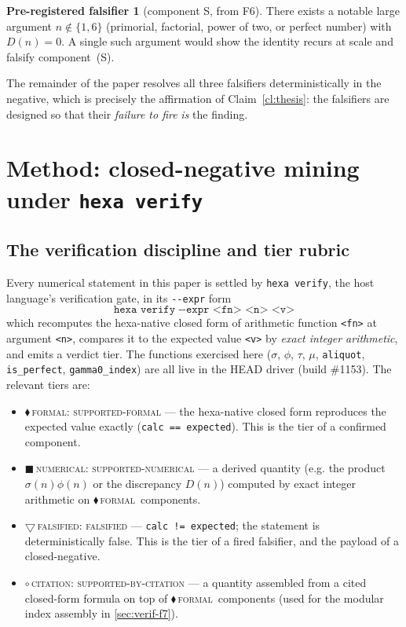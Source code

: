 \documentclass[11pt,a4paper]{article}
\newcommand{\sig}{\sigma}
\newcommand{\Dn}{D(n)}
\newcommand{\tierF}{\textcolor{blue!60!black}{$\blacklozenge$}\,\textsc{formal}}
\newcommand{\tierN}{\textcolor{green!45!black}{$\blacksquare$}\,\textsc{numerical}}
\newcommand{\tierR}{\textcolor{red!70!black}{$\bigtriangledown$}\,\textsc{falsified}}
\newcommand{\tierC}{\textcolor{orange!85!black}{$\circ$}\,\textsc{citation}}
\theoremstyle{definition}
\newtheorem{falsifier}{Pre-registered falsifier}
\begin{document}
\begin{falsifier}[component S, from F6]\label{f:S}
There exists a notable large argument $n\notin\{1,6\}$ (primorial, factorial,
power of two, or perfect number) with $\Dn=0$. A single such argument would
show the identity recurs at scale and falsify component~(S).
\end{falsifier}

The remainder of the paper resolves all three falsifiers deterministically in
the negative, which is precisely the affirmation of Claim~\ref{cl:thesis}: the
falsifiers are designed so that their \emph{failure to fire} \emph{is} the
finding.

\section{Method: closed-negative mining under \texttt{hexa verify}}
\label{sec:method}

\subsection{The verification discipline and tier rubric}

Every numerical statement in this paper is settled by \texttt{hexa verify}, the
host language's verification gate, in its \texttt{-{}-expr} form
\[
  \texttt{hexa verify -{}-expr <fn> <n> <v>}
\]
which recomputes the hexa-native closed form of arithmetic function
\texttt{<fn>} at argument \texttt{<n>}, compares it to the expected value
\texttt{<v>} by \emph{exact integer arithmetic}, and emits a verdict tier. The
functions exercised here ($\sig$, $\phi$, $\tau$, $\mu$, \texttt{aliquot},
\texttt{is\_perfect}, \texttt{gamma0\_index}) are all live in the HEAD driver
(build \#1153). The relevant tiers are:

\begin{itemize}
\item \tierF: \textsc{supported-formal} --- the hexa-native closed form
  reproduces the expected value exactly (\texttt{calc == expected}). This is the
  tier of a confirmed component.
\item \tierN: \textsc{supported-numerical} --- a derived quantity (e.g. the
  product $\sig(n)\phi(n)$ or the discrepancy $\Dn$) computed by exact integer
  arithmetic on \tierF\ components.
\item \tierR: \textsc{falsified} --- \texttt{calc != expected}; the statement
  is deterministically false. This is the tier of a fired falsifier, and the
  payload of a closed-negative.
\item \tierC: \textsc{supported-by-citation} --- a quantity assembled from a
  cited closed-form formula on top of \tierF\ components (used for the modular
  index assembly in \textsection\ref{sec:verif-f7}).
\end{itemize}
\end{document}

